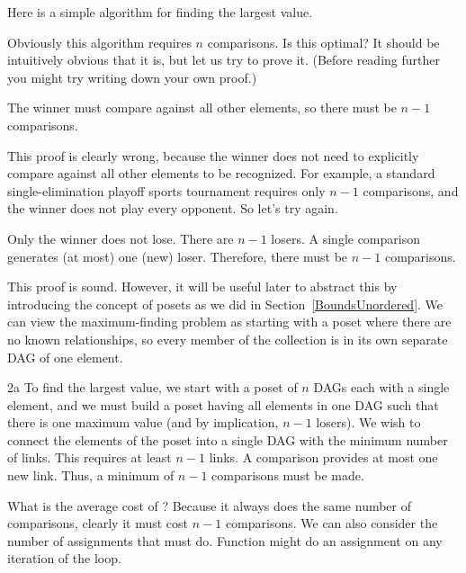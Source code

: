 Here is a simple algorithm for finding the largest value.


Obviously this algorithm requires \(n\) comparisons.
Is this optimal?
It should be intuitively obvious that it is, but let us try to prove
it.
(Before reading further you might try writing down your own proof.)

\begin{numproof}{1}
The winner must compare against all other elements, so there must be
\(n-1\) comparisons.
\end{numproof}

This proof is clearly wrong, because the winner does not need to
explicitly compare against all other elements to be recognized.
For example, a standard single-elimination playoff sports tournament
requires only \(n-1\) comparisons, and the winner does not play every
opponent.
So let's try again.

\begin{numproof}{2}
Only the winner does not lose.
There are \(n-1\) losers.
A single comparison generates (at most) one (new) loser.
Therefore, there must be \(n-1\) comparisons.
\end{numproof}

This proof is sound.
However, it will be useful later to abstract this by introducing the
concept of posets as we did in Section~\ref{BoundsUnordered}.
We can view the maximum-finding problem as starting with a poset where
there are no known relationships, so every member of the collection is
in its own separate DAG of one element.

\begin{numproof}{2a}
To find the largest value, we start with a poset of \(n\) DAGs each
with a single element, and we must build a poset having all elements
in one DAG such that there is one maximum value
(and by implication, \(n-1\) losers).
We wish to connect the elements of the poset into a single DAG with
the minimum number of links.
This requires at least \(n-1\) links.
A comparison provides at most one new link.
Thus, a minimum of \(n-1\) comparisons must be made.
\end{numproof}

What is the average cost of ?
Because it always does the same number of comparisons,
clearly it must cost \(n-1\) comparisons.
We can also consider the number of assignments that 
must do.
Function  might do an assignment on any iteration of the
 loop.


